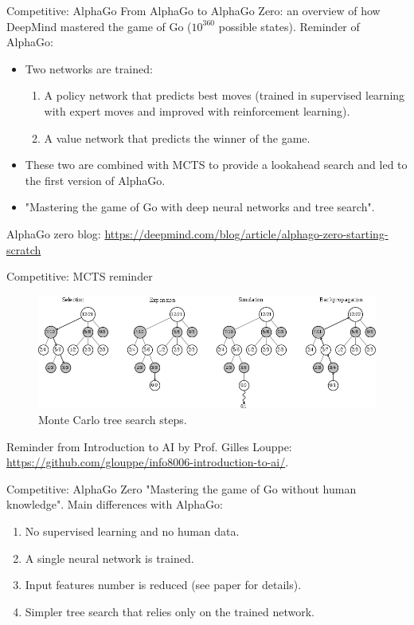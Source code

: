 \documentclass[9pt, hyperref={pdfusetitle,colorlinks=true,allcolors=DarkBlue}]{beamer}
\begin{document}
\begin{frame}{Competitive: AlphaGo}
From AlphaGo to AlphaGo Zero: an overview of how DeepMind mastered the game of Go ($10^{360}$ possible states).
\vfill
Reminder of AlphaGo:
\begin{itemize}
    \item Two networks are trained:
    \begin{enumerate}
        \item A policy network that predicts best moves (trained in supervised learning with expert moves and improved with reinforcement learning).
        \item A value network that predicts the winner of the game.
    \end{enumerate}
    \vfill
    \item These two are combined with MCTS to provide a lookahead search and led to the first version of AlphaGo.
    \vfill
    \item "Mastering the game of Go with deep neural networks and tree search".
\end{itemize}
 \vfill
AlphaGo zero blog: \url{https://deepmind.com/blog/article/alphago-zero-starting-scratch}
\end{frame}

\begin{frame}{Competitive: MCTS reminder}

\begin{figure}
    \centering
    \includegraphics[width=\textwidth]{mcts.png}
    \caption{Monte Carlo tree search steps.}
    \label{fig:mcts}
\end{figure}

Reminder from Introduction to AI by Prof. Gilles Louppe: \url{https://github.com/glouppe/info8006-introduction-to-ai/}.

\end{frame}

\begin{frame}{Competitive: AlphaGo Zero}
"Mastering the game of Go without human knowledge".
\vfill
Main differences with AlphaGo:
\vfill
\begin{enumerate}
    \item No supervised learning and no human data.
    \vfill
    \item A single neural network is trained.
    \vfill
    \item Input features number is reduced (see paper for details).
    \vfill
    \item Simpler tree search that relies only on the trained network.
    \vfill
\end{enumerate}

\end{frame}
\end{document}
